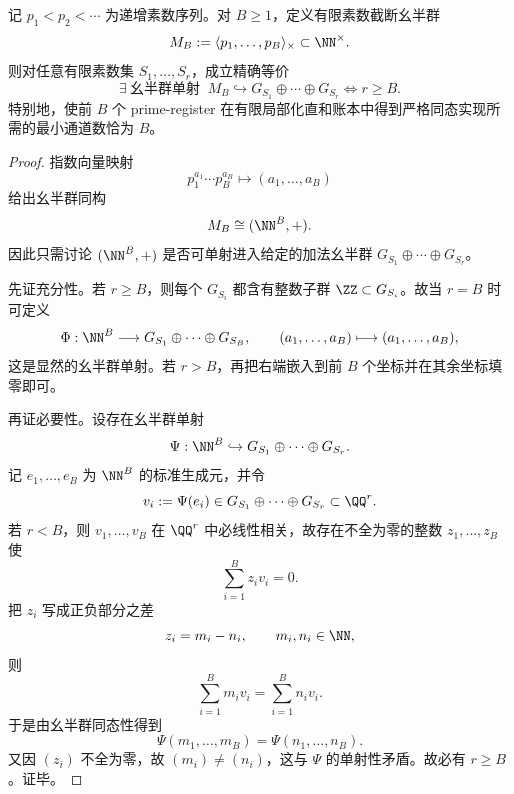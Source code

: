 \begin{theorem}\label{thm:xi-localized-directsum-prime-truncation-minimal-channels}
记 \(p_1<p_2<\cdots\) 为递增素数序列。对 \(B\ge 1\)，定义有限素数截断幺半群
\[
M_B:=\langle p_1,\dots,p_B\rangle_{\times}\subset \NN^\times.
\]
则对任意有限素数集 \(S_1,\dots,S_r\)，成立精确等价
\[
\boxed{\;
\exists\ \text{幺半群单射 }\ 
M_B\hookrightarrow G_{S_1}\oplus\cdots\oplus G_{S_r}
\iff
r\ge B.\;}
\]
特别地，使前 \(B\) 个 prime-register 在有限局部化直和账本中得到严格同态实现所需的最小通道数恰为 \(B\)。
\end{theorem}
\begin{proof}
指数向量映射
\[
p_1^{a_1}\cdots p_B^{a_B}\longmapsto (a_1,\dots,a_B)
\]
给出幺半群同构
\[
M_B\cong (\NN^B,+).
\]
因此只需讨论 \((\NN^B,+)\) 是否可单射进入给定的加法幺半群
\(
G_{S_1}\oplus\cdots\oplus G_{S_r}
\)。

先证充分性。若 \(r\ge B\)，则每个 \(G_{S_i}\) 都含有整数子群 \(\ZZ\subset G_{S_i}\)。故当 \(r=B\) 时可定义
\[
\Phi:\NN^B\longrightarrow G_{S_1}\oplus\cdots\oplus G_{S_B},
\qquad
(a_1,\dots,a_B)\longmapsto (a_1,\dots,a_B),
\]
这是显然的幺半群单射。若 \(r>B\)，再把右端嵌入到前 \(B\) 个坐标并在其余坐标填零即可。

再证必要性。设存在幺半群单射
\[
\Psi:\NN^B\hookrightarrow G_{S_1}\oplus\cdots\oplus G_{S_r}.
\]
记 \(e_1,\dots,e_B\) 为 \(\NN^B\) 的标准生成元，并令
\[
v_i:=\Psi(e_i)\in G_{S_1}\oplus\cdots\oplus G_{S_r}\subset \QQ^r.
\]
若 \(r<B\)，则 \(v_1,\dots,v_B\) 在 \(\QQ^r\) 中必线性相关，故存在不全为零的整数 \(z_1,\dots,z_B\) 使
\[
\sum_{i=1}^B z_i v_i=0.
\]
把 \(z_i\) 写成正负部分之差
\[
z_i=m_i-n_i,
\qquad
m_i,n_i\in \NN,
\]
则
\[
\sum_{i=1}^B m_i v_i=\sum_{i=1}^B n_i v_i.
\]
于是由幺半群同态性得到
\[
\Psi(m_1,\dots,m_B)=\Psi(n_1,\dots,n_B).
\]
又因 \((z_i)\) 不全为零，故 \((m_i)\neq (n_i)\)，这与 \(\Psi\) 的单射性矛盾。故必有 \(r\ge B\)。证毕。
\end{proof}

